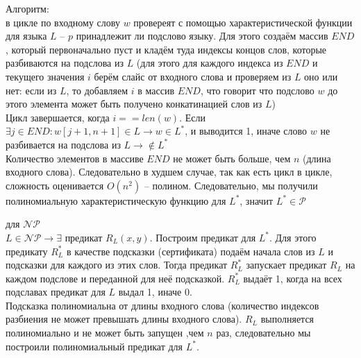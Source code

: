 \documentclass[a4paper,12pt]{article} %
\begin{document}
Алгоритм: \\
в цикле по входному слову $ w $ провереят с помощью характеристической функции для языка $ L $ -- $ p $ принадлежит ли подслово языку. Для этого создаём массив $ END $, который первоначально пуст и кладём туда индексы концов слов, которые разбиваются на подслова из $ L $ (для этого для каждого индекса из $ END $ и текущего значения $ i $ берём слайс от входного слова и проверяем из $ L $ оно или нет: если из $ L $, то добавляем $ i $ в массив $ END $, что говорит что подслово $ w $ до этого элемента может быть получено конкатинацией слов из $ L $)\\
Цикл завершается, когда $ i == len(w) $. Если $ \exists j\in END: w[j+1,n+1]\in L \longrightarrow w\in L^* $, и выводится 1, иначе слово $ w $ не разбивается на подслова из $ L \longrightarrow \notin L^* $\\
Количество элементов в массиве $ END $ не может быть больше, чем $ n $ (длина входного слова). Следовательно в худшем случае, так как есть цикл в цикле, сложность оценивается $ O(n^2) $ -- полином. Следовательно, мы получили полиномиальную характеристическую функцию для $ L^* $, значит $ L^* \in \mathcal{P} $

для $\mathcal{NP}$\\
$ L\in \mathcal{NP} \longrightarrow \exists \text{ предикат } R_L(x, y) $. Построим предикат для $ L^* $. Для этого предикату $R_L^*$ в качестве подсказки (сертификата) подаём начала слов из $ L $ и подсказки для каждого из этих слов. Тогда предикат $R_L^*$ запускает предикат $R_L$ на каждом подслове и переданной для неё подсказкой. $R_L^*$ выдаёт 1, когда на всех подславах предикат для $ L $ выдал 1, иначе 0.\\
Подсказка полиномиальна от длины входного слова (количество индексов разбиения не может превышать длины входного слова). $ R_L $ выполняется полиномиально и не может быть запущен ,чем $ n $ раз, следовательно мы построили полиномиальный предикат для $ L^* $.
\end{document}
